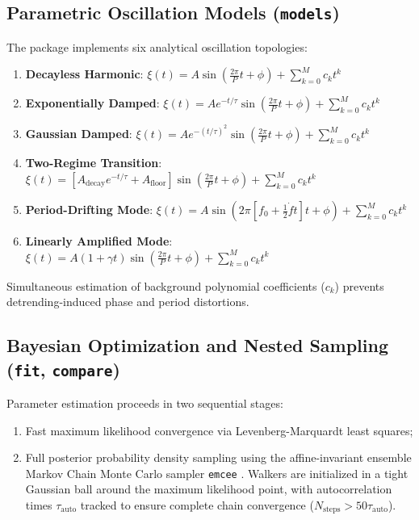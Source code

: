 \documentclass[11pt,a4paper]{article}
\begin{document}
\subsection{Parametric Oscillation Models (\texttt{models})}

The package implements six analytical oscillation topologies:
\begin{enumerate}
    \item \textbf{Decayless Harmonic}: $\xi(t) = A \sin\left(\frac{2\pi}{P}t + \phi\right) + \sum_{k=0}^M c_k t^k$
    \item \textbf{Exponentially Damped}: $\xi(t) = A e^{-t/\tau} \sin\left(\frac{2\pi}{P}t + \phi\right) + \sum_{k=0}^M c_k t^k$
    \item \textbf{Gaussian Damped}: $\xi(t) = A e^{-(t/\tau)^2} \sin\left(\frac{2\pi}{P}t + \phi\right) + \sum_{k=0}^M c_k t^k$
    \item \textbf{Two-Regime Transition}: $\xi(t) = \left[A_{\text{decay}} e^{-t/\tau} + A_{\text{floor}}\right] \sin\left(\frac{2\pi}{P}t + \phi\right) + \sum_{k=0}^M c_k t^k$
    \item \textbf{Period-Drifting Mode}: $\xi(t) = A \sin\left(2\pi [f_0 + \frac{1}{2}\dot{f}t]t + \phi\right) + \sum_{k=0}^M c_k t^k$
    \item \textbf{Linearly Amplified Mode}: $\xi(t) = A (1 + \gamma t) \sin\left(\frac{2\pi}{P}t + \phi\right) + \sum_{k=0}^M c_k t^k$
\end{enumerate}
Simultaneous estimation of background polynomial coefficients ($c_k$) prevents detrending-induced phase and period distortions.

\subsection{Bayesian Optimization and Nested Sampling (\texttt{fit}, \texttt{compare})}

Parameter estimation proceeds in two sequential stages:
\begin{enumerate}
    \item Fast maximum likelihood convergence via Levenberg-Marquardt least squares;
    \item Full posterior probability density sampling using the affine-invariant ensemble Markov Chain Monte Carlo sampler \texttt{emcee} \citep{ForemanMackey2013}. Walkers are initialized in a tight Gaussian ball around the maximum likelihood point, with autocorrelation times $\tau_{\text{auto}}$ tracked to ensure complete chain convergence ($N_{\text{steps}} > 50\tau_{\text{auto}}$).
\end{enumerate}
\end{document}

